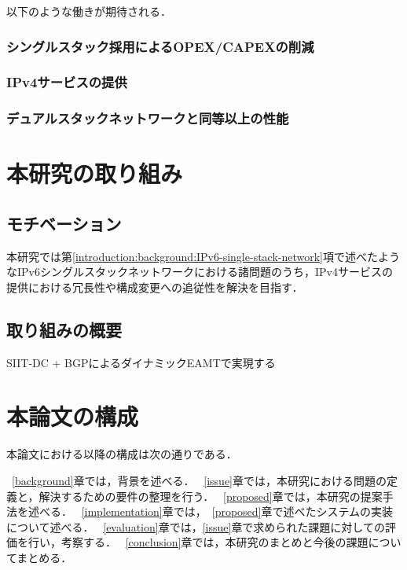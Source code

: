 以下のような働きが期待される．
\subsubsection{シングルスタック採用によるOPEX/CAPEXの削減}
\subsubsection{IPv4サービスの提供}
\subsubsection{デュアルスタックネットワークと同等以上の性能}


\section{本研究の取り組み}
\subsection{モチベーション}
本研究では第\ref{introduction:background:IPv6-single-stack-network}項で述べたようなIPv6シングルスタックネットワークにおける諸問題のうち，IPv4サービスの提供における冗長性や構成変更への追従性を解決を目指す．

\subsection{取り組みの概要}
SIIT-DC + BGPによるダイナミックEAMTで実現する



\section{本論文の構成}

本論文における以降の構成は次の通りである．

~\ref{background}章では，背景を述べる．
~\ref{issue}章では，本研究における問題の定義と，解決するための要件の整理を行う．
~\ref{proposed}章では，本研究の提案手法を述べる．
~\ref{implementation}章では，~\ref{proposed}章で述べたシステムの実装について述べる．
~\ref{evaluation}章では，\ref{issue}章で求められた課題に対しての評価を行い，考察する．
~\ref{conclusion}章では，本研究のまとめと今後の課題についてまとめる．


